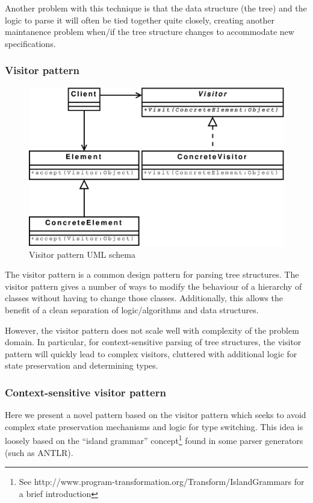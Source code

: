 Another problem with this technique is that the data structure (the tree) and
the logic to parse it will often be tied together quite closely, creating
another maintanence problem when/if the tree structure changes to
accommodate new specifications.

\subsubsection{Visitor pattern}
\label{sect:theory:visitorPattern}

\begin{figure}[h]
  \centering
    \includegraphics[scale=0.40]{diagrams/visitor_pattern} 
  \caption{Visitor pattern UML schema}
  \label{figure:parser:visitor_pattern}
\end{figure}

The visitor pattern\cite{agile_software} is a common design pattern for parsing
tree structures. The visitor pattern gives a number of ways to modify the
behaviour of a hierarchy of classes without having to change those classes.
Additionally, this allows the benefit of a clean separation of logic/algorithms
and data structures.

However, the visitor pattern does not scale well with complexity of the problem
domain. In particular, for context-sensitive parsing of tree structures, the
visitor pattern will quickly lead to complex visitors, cluttered with
additional logic for state preservation and determining types.  

\subsubsection{Context-sensitive visitor pattern}
\label{sect:theory:contextVisitorPattern}
Here we present a novel pattern based on the visitor pattern which seeks to
avoid complex state preservation mechanisms and logic for type switching. This idea
is loosely based on the ``island grammar'' concept\footnote{See
http://www.program-transformation.org/Transform/IslandGrammars for a brief
introduction} found in some parser generators (such as ANTLR). 

